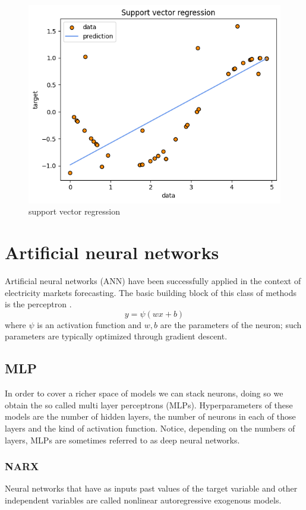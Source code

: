 \begin{figure}
    \includegraphics[width=\textwidth]{images/svr1.png}
    \caption{support vector regression}
    \label{fig:svr1}
\end{figure}

\section{Artificial neural networks}
Artificial neural networks (ANN) have been successfully applied in the context of electricity markets forecasting. The basic building block of this class of methods is the perceptron \cite{rosenblatt1958perceptron}.
\begin{equation}
    y=\psi(wx+b)
\end{equation}
where $\psi$ is an activation function and $w,b$ are the parameters of the neuron; such parameters are typically optimized through gradient descent.

\subsection{MLP}
In order to cover a richer space of models we can stack neurons, doing so we obtain the so called multi layer perceptrons (MLPs). Hyperparameters of these models are the number of hidden layers, the number of neurons in each of those layers and the kind of activation function.
Notice, depending on the numbers of layers, MLPs are sometimes referred to as deep neural networks.

\subsubsection{NARX}
Neural networks that have as inputs past values of the target variable and other independent variables are called nonlinear autoregressive exogenous models.

